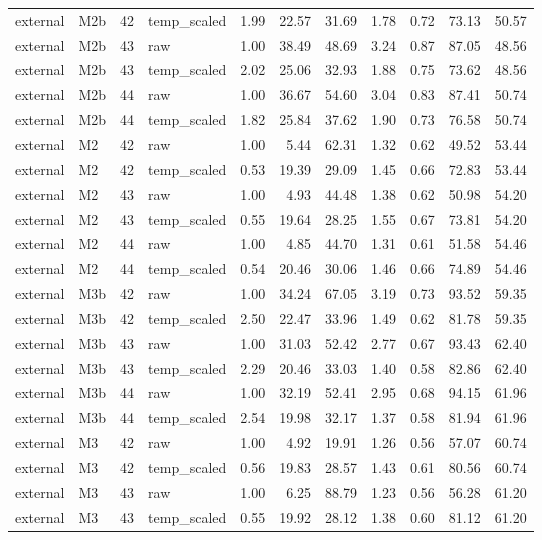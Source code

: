 \begin{tabular}{llrlrrrrrrr}
external & M2b & 42 & temp\_scaled & 1.99 & 22.57 & 31.69 & 1.78 & 0.72 & 73.13 & 50.57 \\
external & M2b & 43 & raw & 1.00 & 38.49 & 48.69 & 3.24 & 0.87 & 87.05 & 48.56 \\
external & M2b & 43 & temp\_scaled & 2.02 & 25.06 & 32.93 & 1.88 & 0.75 & 73.62 & 48.56 \\
external & M2b & 44 & raw & 1.00 & 36.67 & 54.60 & 3.04 & 0.83 & 87.41 & 50.74 \\
external & M2b & 44 & temp\_scaled & 1.82 & 25.84 & 37.62 & 1.90 & 0.73 & 76.58 & 50.74 \\
external & M2 & 42 & raw & 1.00 & 5.44 & 62.31 & 1.32 & 0.62 & 49.52 & 53.44 \\
external & M2 & 42 & temp\_scaled & 0.53 & 19.39 & 29.09 & 1.45 & 0.66 & 72.83 & 53.44 \\
external & M2 & 43 & raw & 1.00 & 4.93 & 44.48 & 1.38 & 0.62 & 50.98 & 54.20 \\
external & M2 & 43 & temp\_scaled & 0.55 & 19.64 & 28.25 & 1.55 & 0.67 & 73.81 & 54.20 \\
external & M2 & 44 & raw & 1.00 & 4.85 & 44.70 & 1.31 & 0.61 & 51.58 & 54.46 \\
external & M2 & 44 & temp\_scaled & 0.54 & 20.46 & 30.06 & 1.46 & 0.66 & 74.89 & 54.46 \\
external & M3b & 42 & raw & 1.00 & 34.24 & 67.05 & 3.19 & 0.73 & 93.52 & 59.35 \\
external & M3b & 42 & temp\_scaled & 2.50 & 22.47 & 33.96 & 1.49 & 0.62 & 81.78 & 59.35 \\
external & M3b & 43 & raw & 1.00 & 31.03 & 52.42 & 2.77 & 0.67 & 93.43 & 62.40 \\
external & M3b & 43 & temp\_scaled & 2.29 & 20.46 & 33.03 & 1.40 & 0.58 & 82.86 & 62.40 \\
external & M3b & 44 & raw & 1.00 & 32.19 & 52.41 & 2.95 & 0.68 & 94.15 & 61.96 \\
external & M3b & 44 & temp\_scaled & 2.54 & 19.98 & 32.17 & 1.37 & 0.58 & 81.94 & 61.96 \\
external & M3 & 42 & raw & 1.00 & 4.92 & 19.91 & 1.26 & 0.56 & 57.07 & 60.74 \\
external & M3 & 42 & temp\_scaled & 0.56 & 19.83 & 28.57 & 1.43 & 0.61 & 80.56 & 60.74 \\
external & M3 & 43 & raw & 1.00 & 6.25 & 88.79 & 1.23 & 0.56 & 56.28 & 61.20 \\
external & M3 & 43 & temp\_scaled & 0.55 & 19.92 & 28.12 & 1.38 & 0.60 & 81.12 & 61.20 \\

\end{tabular}
